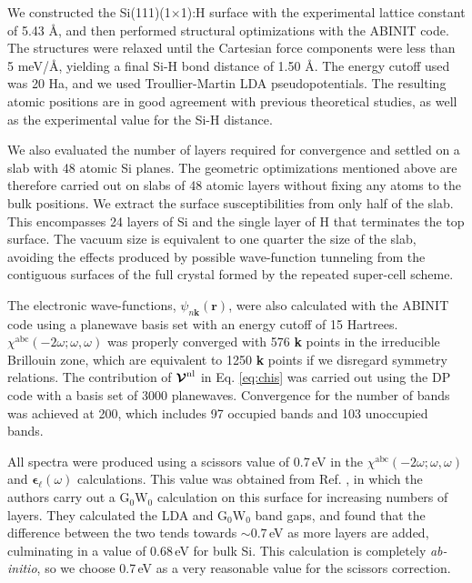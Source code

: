\documentclass[11pt]{book}
\begin{document}
We constructed the Si(111)(1$\times$1):H surface with the experimental lattice
constant of 5.43 \AA, and then performed structural optimizations with the
ABINIT\cite{gonzeCPS09, abinit} code. The structures were relaxed until the
Cartesian force components were less than 5 meV/\AA, yielding a final Si-H bond
distance of 1.50 \AA. The energy cutoff used was 20 Ha, and we used
Troullier-Martin LDA pseudopotentials.\cite{troullierPRB91} The resulting atomic
positions are in good agreement with previous theoretical studies,
\cite{kaxirasPRB88, jonaPRB95, alfonsoPRB96, cargnoniJOCP00, mejiaPRB02} as well
as the experimental value for the Si-H distance.\cite{weastCRC88}

We also evaluated the number of layers required for convergence and settled on a
slab with 48 atomic Si planes. The geometric optimizations mentioned above are
therefore carried out on slabs of 48 atomic layers without fixing any atoms to
the bulk positions. We extract the surface susceptibilities from only half of
the slab. This encompasses 24 layers of Si and the single layer of H that
terminates the top surface. The vacuum size is equivalent to one quarter the
size of the slab, avoiding the effects produced by possible wave-function
tunneling from the contiguous surfaces of the full crystal formed by the
repeated super-cell scheme.\cite{mendozaPRB06}

The electronic wave-functions, $\psi_{n\mathbf{k}}(\mathbf{r})$, were also
calculated with the ABINIT code using a planewave basis set with an energy
cutoff of 15 Hartrees. $\chi^{\mathrm{abc}}(-2\omega;\omega,\omega)$ was
properly converged with 576 \textbf{k} points in the irreducible Brillouin zone,
which are equivalent to 1250 \textbf{k} points if we disregard symmetry
relations. The contribution of $\boldsymbol{\mathcal{\cal V}}^\mathrm{nl}$ in
Eq. \eqref{eq:chis} was carried out using the DP\cite{olevanoDP} code with a
basis set of 3000 planewaves. Convergence for the number of bands was achieved
at 200, which includes 97 occupied bands and 103 unoccupied bands.

All spectra were produced using a scissors value of 0.7\,eV in the
$\chi^{\mathrm{abc}}(-2\omega;\omega,\omega)$ and
$\boldsymbol{\epsilon}_{\ell}(\omega)$ calculations. This value was obtained
from Ref. \cite{liPRB10}, in which the authors carry out a
$\mathrm{G}_{0}\mathrm{W}_{0}$ calculation on this surface for increasing
numbers of layers. They calculated the LDA and $\mathrm{G}_{0}\mathrm{W}_{0}$
band gaps, and found that the difference between the two tends towards
$\sim0.7$\,eV as more layers are added, culminating in a value of 0.68\,eV for
bulk Si. This calculation is completely \emph{ab-initio}, so we choose 0.7\,eV
as a very reasonable value for the scissors correction.
\end{document}
